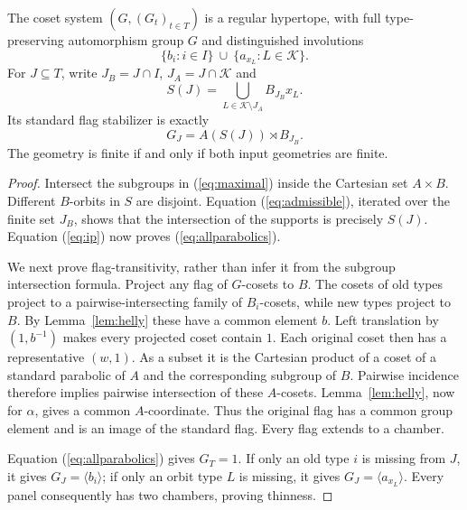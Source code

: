 \begin{theorem}\label{thm:twist}
The coset system $(G,(G_t)_{t\in T})$ is a regular hypertope, with full type-preserving automorphism group $G$ and distinguished involutions
\[
\{b_i:i\in I\}\ \cup\ \{a_{x_L}:L\in\mathcal K\}.
\]
For $J\subseteq T$, write $J_B=J\cap I$, $J_A=J\cap\mathcal K$ and
\[
S(J)=\bigcup_{L\in\mathcal K\setminus J_A}B_{J_B}x_L.
\]
Its standard flag stabilizer is exactly
\begin{equation}\label{eq:allparabolics}
G_J=A(S(J))\rtimes B_{J_B}.
\end{equation}
The geometry is finite if and only if both input geometries are finite.
\end{theorem}
\begin{proof}
Intersect the subgroups in (\ref{eq:maximal}) inside the Cartesian set $A\times B$. Different $B$-orbits in $S$ are disjoint. Equation (\ref{eq:admissible}), iterated over the finite set $J_B$, shows that the intersection of the supports is precisely $S(J)$. Equation (\ref{eq:ip}) now proves (\ref{eq:allparabolics}).

We next prove flag-transitivity, rather than infer it from the subgroup intersection formula. Project any flag of $G$-cosets to $B$. The cosets of old types project to a pairwise-intersecting family of $B_i$-cosets, while new types project to $B$. By Lemma~\ref{lem:helly} these have a common element $b$. Left translation by $(1,b^{-1})$ makes every projected coset contain $1$. Each original coset then has a representative $(w,1)$. As a subset it is the Cartesian product of a coset of a standard parabolic of $A$ and the corresponding subgroup of $B$. Pairwise incidence therefore implies pairwise intersection of these $A$-cosets. Lemma~\ref{lem:helly}, now for $\alpha$, gives a common $A$-coordinate. Thus the original flag has a common group element and is an image of the standard flag. Every flag extends to a chamber.

Equation (\ref{eq:allparabolics}) gives $G_T=1$. If only an old type $i$ is missing from $J$, it gives $G_J=\langle b_i\rangle$; if only an orbit type $L$ is missing, it gives $G_J=\langle a_{x_L}\rangle$. Every panel consequently has two chambers, proving thinness.


\end{proof}
